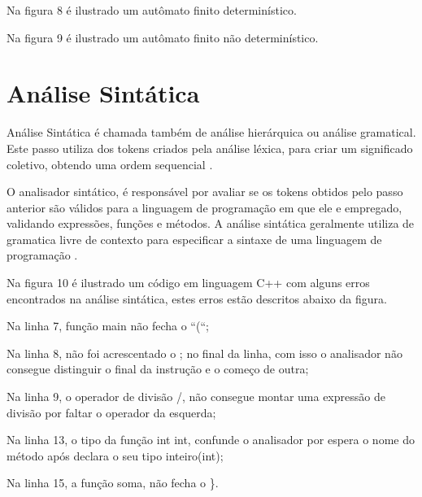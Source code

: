 \documentclass[12pt,oneside,a4paper,chapter=TITLE,section=TITLE,sumario=tradicional]{abntex2}
\begin{document}
Na figura 8 é ilustrado um autômato finito determinístico.

\begin{figure}[H]
\end{figure}

Na figura 9 é ilustrado um autômato finito não determinístico.

\begin{figure}[H]
\end{figure}

\section{Análise Sintática}
\label{sec:analise-sintatica}

Análise Sintática é chamada também de análise hierárquica ou análise gramatical. Este passo utiliza dos tokens criados pela análise léxica, para criar um significado coletivo, obtendo uma ordem sequencial \cite{alfred1995}.

O analisador sintático, é responsável por avaliar se os tokens obtidos pelo passo anterior são válidos para a linguagem de programação em que ele e empregado, validando expressões, funções e métodos. A análise sintática geralmente utiliza de gramatica livre de contexto para especificar a sintaxe de uma linguagem de programação \cite{maragon2015}.

Na figura 10 é ilustrado um código em linguagem C++ com alguns erros encontrados na análise sintática, estes erros estão descritos abaixo da figura.

\begin{figure}[htb]
\end{figure}

\begin{lista}
	\item Na linha 7, função main não fecha o “(“;
	\item Na linha 8, não foi acrescentado o ; no final da linha, com isso o analisador não consegue distinguir o final da instrução e o começo de outra;
	\item Na linha 9, o operador de divisão /, não consegue montar uma expressão de divisão por faltar o operador da esquerda;
	\item Na linha 13, o tipo da função int int, confunde o analisador por espera o nome do método após declara o seu tipo inteiro(int);
	\item Na linha 15, a função soma, não fecha o \}.
\end{lista}
\end{document}
